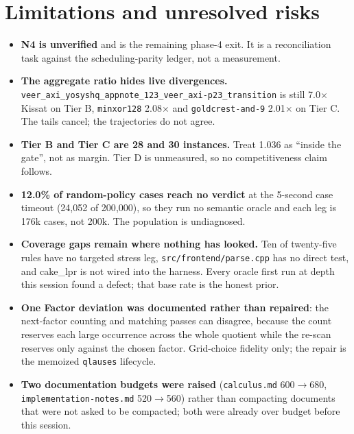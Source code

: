 \documentclass[11pt]{article}
\newcommand{\code}[1]{\texttt{#1}}
\begin{document}
\section*{Limitations and unresolved risks}
\begin{itemize}
\item \textbf{N4 is unverified} and is the remaining phase-4 exit.  It is a
reconciliation task against the scheduling-parity ledger, not a measurement.
\item \textbf{The aggregate ratio hides live divergences.}
\code{veer\_axi\_yosyshq\_appnote\_123\_veer\_axi-p23\_transition} is still
7.0$\times$ Kissat on Tier B, \code{minxor128} 2.08$\times$ and
\code{goldcrest-and-9} 2.01$\times$ on Tier C.  The tails cancel; the
trajectories do not agree.
\item \textbf{Tier B and Tier C are 28 and 30 instances.}  Treat 1.036 as
``inside the gate'', not as margin.  Tier D is unmeasured, so no
competitiveness claim follows.
\item \textbf{12.0\% of random-policy cases reach no verdict} at the 5-second
case timeout (24{,}052 of 200{,}000), so they run no semantic oracle and each
leg is 176k cases, not 200k.  The population is undiagnosed.
\item \textbf{Coverage gaps remain where nothing has looked.}  Ten of
twenty-five rules have no targeted stress leg, \code{src/frontend/parse.cpp} has
no direct test, and cake\_lpr is not wired into the harness.  Every oracle first
run at depth this session found a defect; that base rate is the honest prior.
\item \textbf{One Factor deviation was documented rather than repaired}: the
next-factor counting and matching passes can disagree, because the count
reserves each large occurrence across the whole quotient while the re-scan
reserves only against the chosen factor.  Grid-choice fidelity only; the repair
is the memoized \code{qlauses} lifecycle.
\item \textbf{Two documentation budgets were raised} (\code{calculus.md}
600$\to$680, \code{implementation-notes.md} 520$\to$560) rather than compacting
documents that were not asked to be compacted; both were already over budget
before this session.
\end{itemize}
\end{document}
